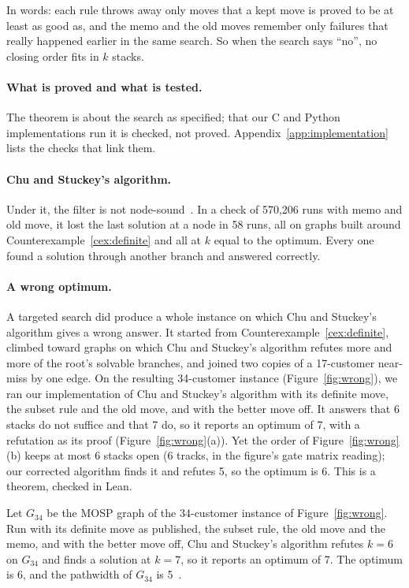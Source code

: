 In words: each rule throws away only moves that a kept move is proved to be at
least as good as, and the memo and the old moves remember only failures that
really happened earlier in the same search. So when the search says ``no'',
no closing order fits in $k$ stacks.

\paragraph{What is proved and what is tested.} The theorem is about the search
as specified; that our C and Python implementations run it is checked, not
proved. Appendix~\ref{app:implementation} lists the checks that link them.

\paragraph{Chu and Stuckey's algorithm.} Under it, the filter is not
node-sound~. In a check of 570,206 runs with memo and old
move, it lost the last solution at a node in 58 runs, all on graphs built
around Counterexample~\ref{cex:definite} and all at $k$ equal to the optimum.
Every one found a solution through another branch and answered correctly.

\paragraph{A wrong optimum.} A targeted search did produce a whole instance on
which Chu and Stuckey's algorithm gives a wrong answer. It started from
Counterexample~\ref{cex:definite}, climbed toward graphs on which Chu and Stuckey's
algorithm refutes more and more of the root's solvable branches, and joined two
copies of a 17-customer near-miss by one edge. On the resulting 34-customer instance (Figure~\ref{fig:wrong}), we ran our
implementation of Chu and Stuckey's algorithm with its definite move, the subset
rule and the old move, and with the better move off. It answers that 6 stacks
do not suffice and that 7 do, so it reports an optimum of 7, with a refutation
as its proof (Figure~\ref{fig:wrong}(a)). Yet the order of
Figure~\ref{fig:wrong}(b) keeps at most 6 stacks open (6 tracks, in the
figure's gate matrix reading); our corrected algorithm finds it and
refutes 5, so the optimum is 6. This is a theorem, checked in Lean.

\begin{theorem}\label{thm:wrong}
Let $G_{34}$ be the MOSP graph of the 34-customer instance of
Figure~\ref{fig:wrong}. Run with its definite move as published, the subset
rule, the old move and the memo, and with the better move off, Chu and Stuckey's
algorithm refutes $k=6$ on $G_{34}$ and finds a solution at $k=7$, so it
reports an optimum of 7. The optimum is 6, and the pathwidth of $G_{34}$ is
5~.
\end{theorem}

